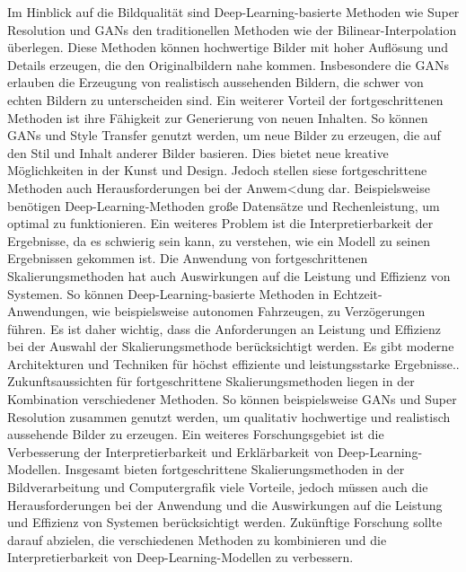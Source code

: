     Im Hinblick auf die Bildqualität sind Deep-Learning-basierte Methoden wie Super Resolution und GANs den traditionellen Methoden wie der Bilinear-Interpolation überlegen.      
    Diese Methoden können hochwertige Bilder mit hoher Auflösung und Details erzeugen, die den Originalbildern nahe kommen.      
    Insbesondere die GANs erlauben die Erzeugung von realistisch aussehenden Bildern, die schwer von echten Bildern zu unterscheiden sind.
    Ein weiterer Vorteil der fortgeschrittenen Methoden ist ihre Fähigkeit zur Generierung von neuen Inhalten.      
    So können GANs und Style Transfer genutzt werden, um neue Bilder zu erzeugen, die auf den Stil und Inhalt anderer Bilder basieren.      
    Dies bietet neue kreative Möglichkeiten in der Kunst und Design.
    Jedoch stellen siese fortgeschrittene Methoden auch Herausforderungen bei der Anwem<dung dar.      
    Beispielsweise benötigen Deep-Learning-Methoden große Datensätze und Rechenleistung, um optimal zu funktionieren.      
    Ein weiteres Problem ist die Interpretierbarkeit der Ergebnisse, da es schwierig sein kann, zu verstehen, wie ein Modell zu seinen Ergebnissen gekommen ist.
    Die Anwendung von fortgeschrittenen Skalierungsmethoden hat auch Auswirkungen auf die Leistung und Effizienz von Systemen.      
    So können Deep-Learning-basierte Methoden in Echtzeit-Anwendungen, wie beispielsweise autonomen Fahrzeugen, zu Verzögerungen führen.      
    Es ist daher wichtig, dass die Anforderungen an Leistung und Effizienz bei der Auswahl der Skalierungsmethode berücksichtigt werden.      
    Es gibt moderne Architekturen und Techniken für höchst effiziente und leistungsstarke Ergebnisse..
    Zukunftsaussichten für fortgeschrittene Skalierungsmethoden liegen in der Kombination verschiedener Methoden.      
    So können beispielsweise GANs und Super Resolution zusammen genutzt werden, um qualitativ hochwertige und realistisch aussehende Bilder zu erzeugen.      
    Ein weiteres Forschungsgebiet ist die Verbesserung der Interpretierbarkeit und Erklärbarkeit von Deep-Learning-Modellen.      
    Insgesamt bieten fortgeschrittene Skalierungsmethoden in der Bildverarbeitung und Computergrafik viele Vorteile, jedoch müssen auch die Herausforderungen bei der Anwendung und die Auswirkungen auf die Leistung und Effizienz von Systemen berücksichtigt werden.      
    Zukünftige Forschung sollte darauf abzielen, die verschiedenen Methoden zu kombinieren und die Interpretierbarkeit von Deep-Learning-Modellen zu verbessern.

\newpage
